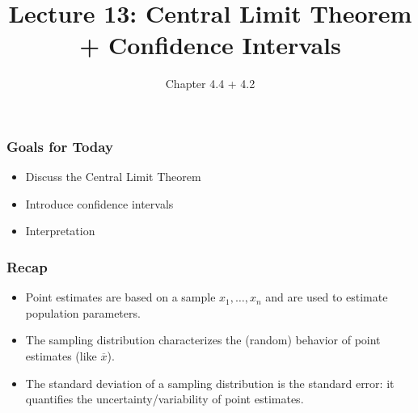 \documentclass[slides]{beamer}
\title{Lecture 13: Central Limit Theorem + Confidence Intervals}
\author{Chapter 4.4 + 4.2}
\date{}
\newcommand{\blue}[1]{\textcolor{blue2}{#1}}
\newcommand{\xbar}{\overline{x}}
\begin{document}
\begin{frame}
\titlepage
\end{frame}


\begin{frame}[fragile]
\frametitle{Goals for Today}

\begin{itemize}
\item Discuss the Central Limit Theorem
\item Introduce confidence intervals
\item Interpretation
\end{itemize}

\end{frame}


\begin{frame}[fragile]
\frametitle{Recap}

\begin{itemize}
\item \blue{Point estimates} are based on a sample $x_1, \ldots, x_n$ and are used to estimate population parameters.
\pause \item The \blue{sampling distribution} characterizes the (random) behavior of point estimates (like $\xbar$).
\pause \item The standard deviation of a sampling distribution is the \blue{standard error}: it quantifies the uncertainty/variability of point estimates.  
\end{itemize}

\end{frame}
\end{document}
